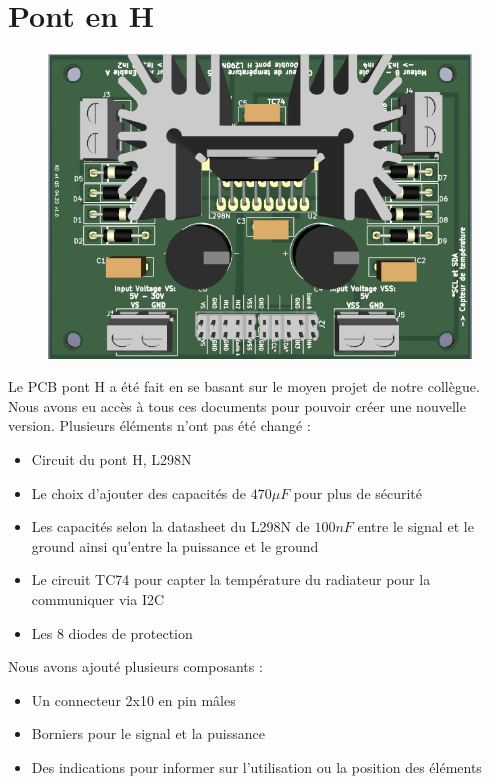 \documentclass[
	a4paper,									%
	11pt,										%
	twoside,									%
	openright,									%
	notitlepage,									%
	parskip=half,								%
]{scrreprt}										%
\begin{document}
\section{Pont en H}

\begin{figure}[!ht]
	\centering
	\includegraphics[scale=.7]{img/PontH.png}
	\label{PontH}
\end{figure}

Le PCB pont H a été fait en se basant sur le moyen projet de notre collègue. 
Nous avons eu accès à tous ces documents pour pouvoir créer une nouvelle version. Plusieurs éléments n'ont pas été 
changé : 

\begin{itemize}
	\item Circuit du pont H, L298N
	\item Le choix d'ajouter des capacités de $470\mu F$ pour plus de sécurité
	\item Les capacités selon la datasheet du L298N de $100nF$ entre le signal et le ground ainsi qu'entre la puissance et le ground
	\item Le circuit TC74 pour capter la température du radiateur pour la communiquer via I2C
	\item Les 8 diodes de protection
\end{itemize}

Nous avons ajouté plusieurs composants : 

\begin{itemize}
	\item Un connecteur 2x10 en pin mâles
	\item Borniers pour le signal et la puissance
	\item Des indications pour informer sur l'utilisation ou la position des éléments
\end{itemize}
\end{document}
